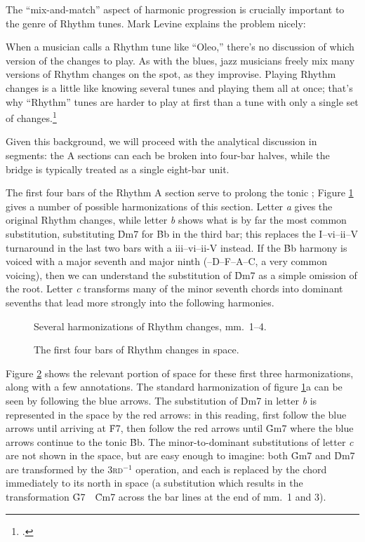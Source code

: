 The ``mix-and-match'' aspect of harmonic progression is crucially important to
the genre of Rhythm tunes. Mark Levine explains the problem
nicely:%
%
\begin{quoting}
  \singlespacing
  When a musician calls a Rhythm tune like ``Oleo,'' there's no discussion of
  which version of the changes to play. As with the blues, jazz musicians
  freely mix many versions of Rhythm changes on the spot, as they improvise.
  Playing Rhythm changes is a little like knowing several tunes and playing
  them all at once; that's why ``Rhythm'' tunes are harder to play at first
  than a tune with only a single set of changes.\footcite[241]{levine:1995}
\end{quoting}
%
Given this background, we will proceed with the analytical discussion in
segments: the A sections can each be broken into four-bar halves, while the
bridge is typically treated as a single eight-bar unit.

The first four bars of the Rhythm A section serve to prolong the tonic \Bflat;
Figure \ref{rcg:rc-first-four} gives a number of possible harmonizations of
this section. Letter \emph{a} gives the original Rhythm changes,
while letter \emph{b} shows what is by far the most common substitution,
substituting \h{Dm7} for \h{Bb} in the third bar; this replaces the
I--vi--ii--V turnaround in the last two bars with a iii--vi--ii-V instead. If
the \h{Bb} harmony is voiced with a major seventh and major ninth
(\Bflat--D--F--A--C, a very common voicing), then we can understand the
substitution of \h{Dm7} as a simple omission of the root. Letter \emph{c}
transforms many of the minor seventh chords into dominant sevenths that lead
more strongly into the following harmonies.

\begin{figure}[tbp]
  \caption{Several harmonizations of Rhythm changes, mm.~1--4.}
  \label{rcg:rc-first-four}
\end{figure}

\begin{figure}[tbp]
  \caption{The first four bars of Rhythm changes in \tf space.}
  \label{rcg:rc-first-four-space}
\end{figure}

Figure \ref{rcg:rc-first-four-space} shows the relevant portion of \tf space
for these first three harmonizations, along with a few annotations. The
standard harmonization of figure \ref{rcg:rc-first-four}a can be seen by
following the blue arrows. The substitution of \h{Dm7} in letter \emph{b} is
represented in the space by the red arrows: in this reading, first follow the
blue arrows until arriving at \h{F7}, then follow the red arrows until \h{Gm7}
where the blue arrows continue to the tonic \h{Bb}. The minor-to-dominant
substitutions of letter \emph{c} are not shown in the space, but are easy
enough to imagine: both \h{Gm7} and \h{Dm7} are transformed by the
\textsc{3rd}$^{-1}$ operation, and each is replaced by the chord immediately
to its north in \tf space (a substitution which results in the transformation
\mbox{\h{G7} \ECarrow\ \h{Cm7}} across the bar lines at the end of mm.~1 and
3).


